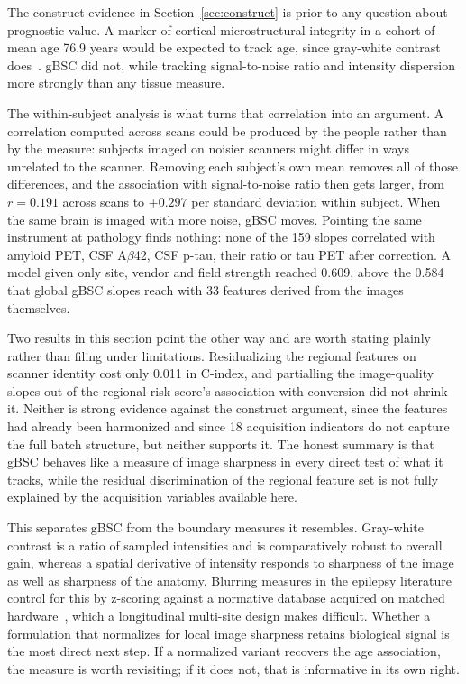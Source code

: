 \documentclass[blue]{ludusofficial}  %
\begin{document}
The construct evidence in Section~\ref{sec:construct} is prior to any question about prognostic value. A marker of cortical microstructural integrity in a cohort of mean age 76.9 years would be expected to track age, since gray-white contrast does~\cite{salat2009age}. gBSC did not, while tracking signal-to-noise ratio and intensity dispersion more strongly than any tissue measure.

The within-subject analysis is what turns that correlation into an argument. A correlation computed across scans could be produced by the people rather than by the measure: subjects imaged on noisier scanners might differ in ways unrelated to the scanner. Removing each subject's own mean removes all of those differences, and the association with signal-to-noise ratio then gets larger, from $r = 0.191$ across scans to $+0.297$ per standard deviation within subject. When the same brain is imaged with more noise, gBSC moves. Pointing the same instrument at pathology finds nothing: none of the 159 slopes correlated with amyloid PET, CSF A$\beta$42, CSF p-tau, their ratio or tau PET after correction. A model given only site, vendor and field strength reached 0.609, above the 0.584 that global gBSC slopes reach with 33 features derived from the images themselves.

Two results in this section point the other way and are worth stating plainly rather than filing under limitations. Residualizing the regional features on scanner identity cost only 0.011 in C-index, and partialling the image-quality slopes out of the regional risk score's association with conversion did not shrink it. Neither is strong evidence against the construct argument, since the features had already been harmonized and since 18 acquisition indicators do not capture the full batch structure, but neither supports it. The honest summary is that gBSC behaves like a measure of image sharpness in every direct test of what it tracks, while the residual discrimination of the regional feature set is not fully explained by the acquisition variables available here.

This separates gBSC from the boundary measures it resembles. Gray-white contrast is a ratio of sampled intensities and is comparatively robust to overall gain, whereas a spatial derivative of intensity responds to sharpness of the image as well as sharpness of the anatomy. Blurring measures in the epilepsy literature control for this by z-scoring against a normative database acquired on matched hardware~\cite{huppertz2005enhanced,blackmon2015cortical}, which a longitudinal multi-site design makes difficult. Whether a formulation that normalizes for local image sharpness retains biological signal is the most direct next step. If a normalized variant recovers the age association, the measure is worth revisiting; if it does not, that is informative in its own right.
\end{document}
